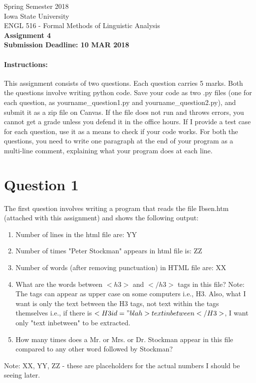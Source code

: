 \documentclass[11pt,a4paper]{article}
\begin{document}
\begin{center}
  Spring Semester 2018 \\ Iowa State University\\[3ex]
  {\large ENGL 516 - Formal Methods of Linguistic Analysis}\\[3ex]
  \textbf{Assignment 4} \\ \textbf{Submission Deadline: 10 MAR 2018}
\end{center}


\paragraph{Instructions:} This assignment consists of two questions. Each question carries 5 marks. Both the questions involve writing python code. Save your code as two .py files (one for each question, as yourname\_question1.py and yourname\_question2.py), and submit it as a zip file on Canvas. If the file does not run and throws errors, you cannot get a grade unless you defend it in the office hours. If I provide a test case for each question, use it as a means to check if your code works. For both the questions, you need to write one paragraph at the end of your program as a multi-line comment, explaining what your program does at each line.

\section*{Question 1}
The first question involves writing a program that reads the file Ibsen.htm (attached with this assignment) and shows the following output:
\begin{enumerate}
\item Number of lines in the html file are: YY
\item Number of times "Peter Stockman" appears in html file is: ZZ
\item Number of words (after removing punctuation) in HTML file are: XX
\item What are the words between $<h3>$ and $</h3>$ tags in this file? Note: The tags can appear as upper case on some computers i.e., H3. Also, what I want is only the text between the H3 tags, not text within the tags themselves i.e., if there is $<H3 id="blah>text inbetween</H3>$, I want only "text inbetween" to be extracted. 
\item How many times does a Mr. or Mrs. or Dr. Stockman appear in this file compared to any other word followed by Stockman?
\end{enumerate}
Note: XX, YY, ZZ - these are placeholders for the actual numbers I should be seeing later.
\end{document}
